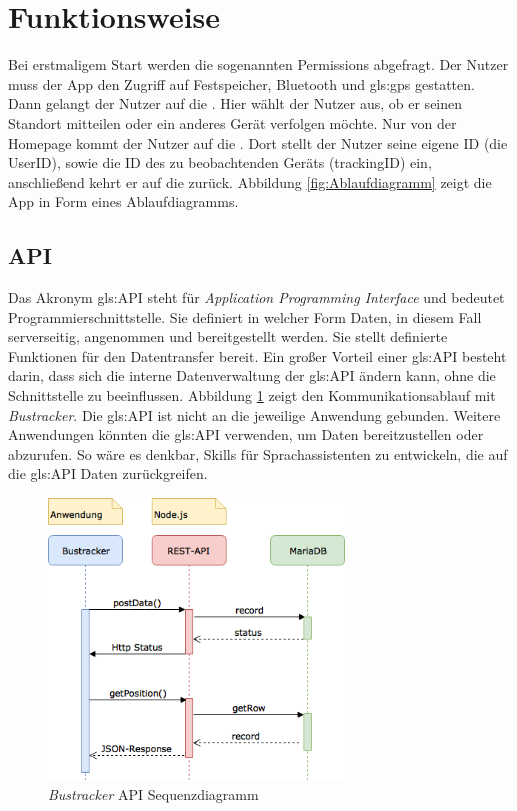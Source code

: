 \section{Funktionsweise}

Bei erstmaligem Start werden die sogenannten Permissions abgefragt. Der Nutzer muss der App den Zugriff auf Festspeicher, Bluetooth und \gls{gls:gps} gestatten. Dann gelangt der Nutzer auf die . Hier wählt der Nutzer aus, ob er seinen Standort mitteilen oder ein anderes Gerät verfolgen möchte. Nur von der Homepage kommt der Nutzer auf die . Dort stellt der Nutzer seine eigene ID (die UserID), sowie die ID des zu beobachtenden Geräts (trackingID) ein, anschließend kehrt er auf die  zurück. Abbildung \ref{fig:Ablaufdiagramm} zeigt die App in Form eines Ablaufdiagramms. 



\subsection{API}
\label{API}
Das Akronym \gls{gls:API} steht für \emph{Application Programming Interface} und bedeutet Programmierschnittstelle. Sie definiert in welcher Form Daten, in diesem Fall serverseitig, angenommen und bereitgestellt werden. Sie stellt definierte Funktionen für den Datentransfer bereit. Ein großer Vorteil einer \gls{gls:API} besteht darin, dass sich die interne Datenverwaltung der \gls{gls:API} ändern kann, ohne die Schnittstelle zu beeinflussen.
Abbildung \ref{fig:API} zeigt den Kommunikationsablauf mit \emph{Bustracker}.
Die \gls{gls:API} ist nicht an die jeweilige Anwendung gebunden. Weitere Anwendungen könnten die \gls{gls:API} verwenden, um Daten bereitzustellen oder abzurufen. So wäre es denkbar, Skills für Sprachassistenten zu entwickeln, die auf die \gls{gls:API} Daten zurückgreifen. 

\begin{figure}[htbp] 
  \centering
     \includegraphics[width=0.7\textwidth]{images/APIsequence.png} 
  \caption{\emph{Bustracker} API Sequenzdiagramm}
  \label{fig:API}
\end{figure}

